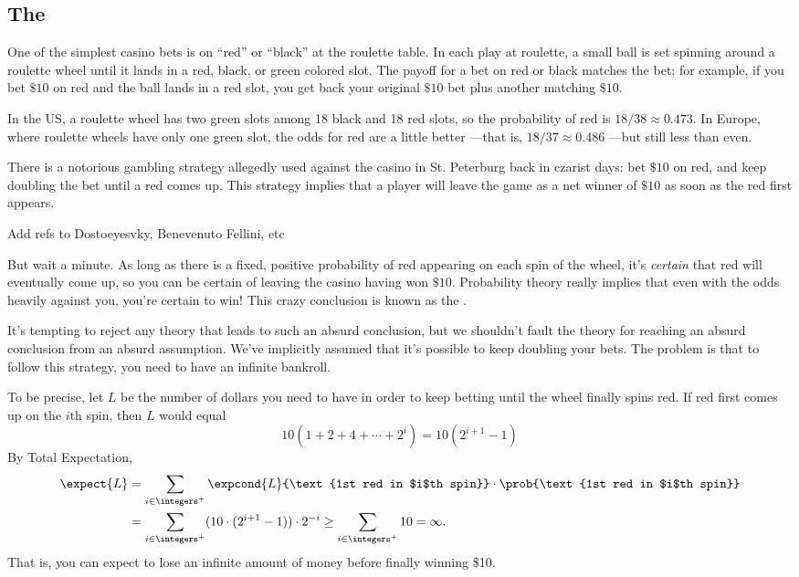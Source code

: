 \subsection{The }\label{sec:st_petersburg}

One of the simplest casino bets is on ``red'' or ``black'' at the roulette
table.  In each play at roulette, a small ball is set spinning around a
roulette wheel until it lands in a red, black, or green colored slot.
The payoff for a bet on red or black matches the bet; for example, if you bet
$\$10$ on red and the ball lands in a red slot, you get back your original
$\$10$ bet plus another matching $\$10$.

In the US, a roulette wheel has two green slots among 18 black and 18 red
slots, so the probability of red is $18/38 \approx 0.473$.  In
Europe, where roulette wheels have only one green slot, the odds for red
are a little better ---that is, $18/37 \approx 0.486$ ---but still less
than even.

There is a notorious gambling strategy allegedly used against the
casino in St. Peterburg back in czarist days: bet $\$10$ on red, and
keep doubling the bet until a red comes up.  This strategy implies
that a player will leave the game as a net winner of $\$10$ as soon as
the red first appears.

\begin{editingnotes}
Add refs to Dostoeyesvky, Benevenuto Fellini, etc
\end{editingnotes}

But wait a minute.  As long as there is a fixed, positive probability
of red appearing on each spin of the wheel, it's \emph{certain} that
red will eventually come up, so you can be certain of leaving the
casino having won $\$10$.  Probability theory really implies that even
with the odds heavily against you, you're certain to win!  This crazy
conclusion is known as the .

It's tempting to reject any theory that leads to such an absurd
conclusion, but we shouldn't fault the theory for reaching an absurd
conclusion from an absurd assumption.  We've implicitly assumed that
it's possible to keep doubling your bets.  The problem is that to
follow this strategy, you need to have an infinite bankroll.

To be precise, let $L$ be the number of dollars you need to have in
order to keep betting until the wheel finally spins red.  If red first
comes up on the $i$th spin, then $L$ would equal
\[
10(1 + 2 + 4 + \cdots + 2^i) = 10(2^{i+1}- 1)
\]
By Total Expectation,
\begin{align*}
\expect{L} 
& = \sum_{i \in \integers^+} \expcond{L}{\text{1st red in $i$th spin}} \cdot
       \prob{\text{1st red in $i$th spin}}\\
& = \sum_{i \in \integers^+} (10 \cdot (2^{i+1} -1)) \cdot 2^{-i}
       \geq \sum_{i \in \integers^+} 10 = \infty.
\end{align*}
That is, you can expect to lose an infinite amount of money before
finally winning \$10.

